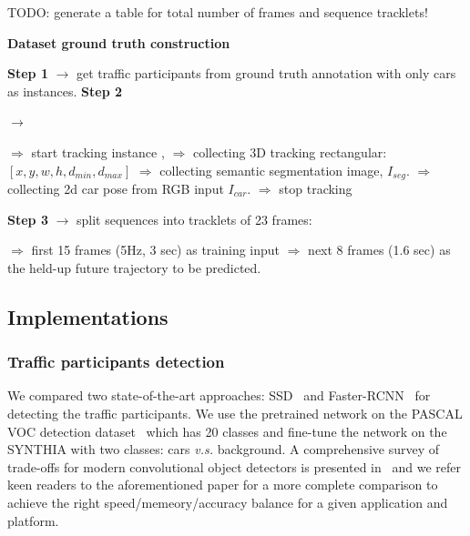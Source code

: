 \documentclass[10pt,twocolumn,letterpaper]{article}
\newlength\myindent
\newcommand\bindent[1][\myindent]{%
  \begingroup
  \setlength{\itemindent}{#1}
  \addtolength{\algorithmicindent}{#1}
}
\newcommand\eindent{\endgroup}
\begin{document}
TODO: generate a table for total number of frames and sequence tracklets!

\begin{algorithm}[h]
\begin{algorithmic}
\caption{\textbf{Dataset ground truth construction}}\label{list:dataset_collection}
\STATE \textbf{Step 1} $\rightarrow $ get traffic participants from ground truth annotation with only cars as instances.
\STATE \textbf{Step 2} {$\rightarrow $ { 
\bindent
    \STATE $\Rightarrow$ start tracking instance , 
    \STATE $\Rightarrow$ collecting 3D tracking rectangular: $[x, y, w, h, d_{min}, d_{max}]$
    \STATE $\Rightarrow$ collecting semantic segmentation image, $I_{seg}$.
    \STATE $\Rightarrow$ collecting 2d car pose from RGB input $I_{car}$.
    \STATE $\Rightarrow$ stop tracking 
    \ENDIF\eindent}
  }
\STATE \textbf{Step 3} $\rightarrow $ split sequences into tracklets of 23 frames:
{\bindent
    \STATE $\Rightarrow$  first 15 frames (5Hz, 3 sec) as training input
    \STATE $\Rightarrow$  next 8 frames (1.6 sec) as the held-up future trajectory to be predicted.
\eindent}    
\end{algorithmic}
\end{algorithm}

\subsection{Implementations}\label{sec:Implementations}

\subsubsection{Traffic participants detection}

We compared two state-of-the-art approaches: SSD~\cite{liu2016ssd} and Faster-RCNN~\cite{ren2015faster} for detecting the traffic participants.
We use the pretrained network on the PASCAL VOC detection dataset~\cite{everingham2015pascal} which has 20 classes and fine-tune the network on the SYNTHIA with two classes: cars \emph{v.s.} background.
A comprehensive survey of trade-offs for modern convolutional object detectors is presented in~\cite{huang2017speed} and we refer keen readers to the aforementioned paper for a more complete comparison to achieve the right speed/memeory/accuracy balance for a given application and platform.
\end{document}
